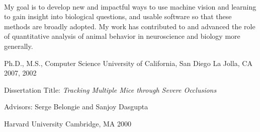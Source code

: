 \documentclass[11pt, letterpaper]{awesome-cv}
\begin{document}
\makecvheader[C]


% 
% 
% 
% 

\vspace{\acvSectionContentTopSkip}\\
My goal is to develop new and impactful ways to use machine vision and learning to gain insight into biological questions, and usable software so that these methods are broadly adopted. My work has contributed to and advanced the role of quantitative analysis of animal behavior in neuroscience and biology more generally. 

\begin{cventries}
  \cventry
    {Ph.D., M.S., Computer Science} %
    {University of California, San Diego} %
    {La Jolla, CA} %
    {2007, 2002} %
    {
      \begin{cvitems} %
      \item Dissertation Title: {\it Tracking Multiple Mice through Severe Occlusions}
      \item Advisors: Serge Belongie and Sanjoy Dasgupta
      \end{cvitems}
    }
    {Harvard University}
    {Cambridge, MA}
    {2000}
    {}
\end{cventries}
\vspace{-4mm}


\begin{cventries}
\end{cventries}
\end{document}
